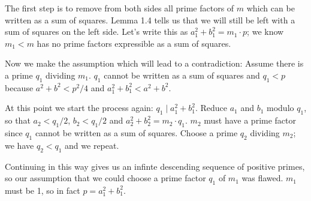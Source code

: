 The first step is to remove from both sides all prime factors of $m$ which can be written as a sum of squares. Lemma 1.4 tells us that we will still be left with a sum of squares on the left side. Let's write this as $a_1^2+b_1^2=m_1\cdot p$; we know $m_1<m$ has no prime factors expressible as a sum of squares.

Now we make the assumption which will lead to a contradiction: Assume there is a prime $q_1$ dividing $m_1$. $q_1$ cannot be written as a sum of squares and $q_1<p$ because $a^2+b^2<p^2/4$ and $a_1^2+b_1^2<a^2+b^2$.

At this point we start the process again: $q_1\mid a_1^2+b_1^2$. Reduce $a_1$ and $b_1$ modulo $q_1$, so that $a_2<q_1/2$, $b_2<q_1/2$ and $a_2^2+b_2^2 = m_2\cdot q_1$. $m_2$ must have a prime factor since $q_1$ cannot be written as a sum of squares. Choose a prime $q_2$ dividing $m_2$; we have $q_2<q_1$ and we repeat.

Continuing in this way gives us an infinte descending sequence of positive primes, so our assumption that we could choose a prime factor $q_1$ of $m_1$ was flawed. $m_1$ must be 1, so in fact $p=a_1^2+b_1^2$.


